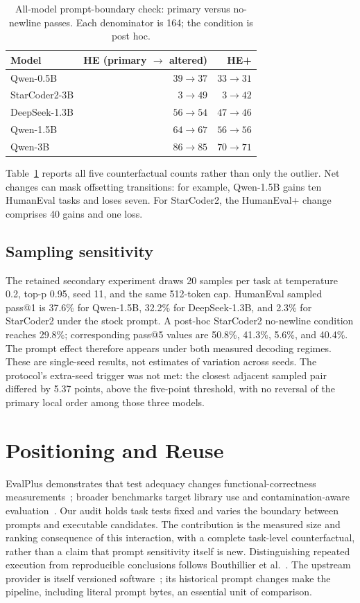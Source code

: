 \documentclass[10pt,conference]{IEEEtran}
\begin{document}
\begin{table}[t]
\caption{All-model prompt-boundary check: primary versus no-newline passes.
Each denominator is 164; the condition is post hoc.}
\label{tab:newline}
\centering\small
\begin{tabular}{lrr}
\toprule
Model & HE (primary $\to$ altered) & HE+ \\
\midrule
Qwen-0.5B & $39\to37$ & $33\to31$ \\
StarCoder2-3B & $3\to49$ & $3\to42$ \\
DeepSeek-1.3B & $56\to54$ & $47\to46$ \\
Qwen-1.5B & $64\to67$ & $56\to56$ \\
Qwen-3B & $86\to85$ & $70\to71$ \\
\bottomrule
\end{tabular}
\end{table}

Table~\ref{tab:newline} reports all five counterfactual counts rather than only
the outlier. Net changes can mask offsetting transitions: for example,
Qwen-1.5B gains ten HumanEval tasks and loses seven. For StarCoder2, the
HumanEval+ change comprises 40 gains and one loss.

\subsection{Sampling sensitivity}
The retained secondary experiment draws 20 samples per task at temperature
0.2, top-p 0.95, seed 11, and the same 512-token cap. HumanEval sampled pass@1
is 37.6\% for Qwen-1.5B, 32.2\% for DeepSeek-1.3B, and 2.3\% for StarCoder2
under the stock prompt. A post-hoc StarCoder2 no-newline condition reaches
29.8\%; corresponding pass@5 values are 50.8\%, 41.3\%, 5.6\%, and 40.4\%.
The prompt effect therefore appears under both measured decoding regimes.
These are single-seed results, not estimates of variation across seeds.
The protocol's extra-seed trigger was not met: the closest adjacent sampled
pair differed by 5.37 points, above the five-point threshold, with no reversal
of the primary local order among those three models.

\section{Positioning and Reuse}
EvalPlus demonstrates that test adequacy changes functional-correctness
measurements~\cite{liu2023evalplus}; broader benchmarks target library use and
contamination-aware evaluation~\cite{zhuo2024bigcodebench,jain2024livecodebench}.
Our audit holds task tests fixed and varies the boundary between prompts and
executable candidates. The contribution is the measured size and ranking
consequence of this interaction, with a complete task-level counterfactual,
rather than a claim that prompt sensitivity itself is new.
Distinguishing repeated execution from reproducible conclusions follows
Bouthillier et al.~\cite{bouthillier2019reproducible}.
The upstream provider is itself versioned software~\cite{evalplus2026setup};
its historical prompt changes make the pipeline, including literal prompt
bytes, an essential unit of comparison.
\end{document}

